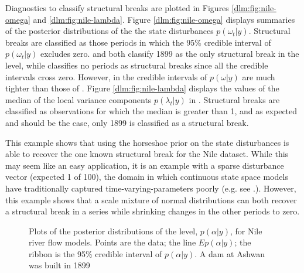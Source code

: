 Diagnostics to classify structural breaks are plotted in Figures \ref{dlm:fig:nile-omega} and \ref{dlm:fig:nile-lambda}.
Figure \ref{dlm:fig:nile-omega} displays summaries of the posterior distributions of the the state disturbances $p(\omega_{t} | y)$.
Structural breaks are classified as those periods in which the 95\% credible interval of $p(\omega_{t} | y)$ excludes zero.
 and  both classify 1899 as the only structural break in the level, while  classifies no periods as structural breaks since all the credible intervals cross zero.
However, in  the credible intervals of $p(\omega|y)$ are much tighter than those of .
Figure \ref{dlm:fig:nile-lambda} displays the values of the median of the local variance components $p(\lambda_{t} | y)$ in .
Structural breaks are classified as observations for which the median is greater than 1, and as expected and should be the case, only 1899 is classified as a structural break.

This example shows that using the horseshoe prior on the state disturbances is able to recover the one known structural break for the Nile dataset.
While this may seem like an easy application, it is an example with a sparse disturbance vector (expected 1 of 100), the domain in which continuous state space models have traditionally captured time-varying-parameters poorly (e.g. see .).
However, this example shows that a scale mixture of normal distributions can both recover a structural break in a series while shrinking changes in the other periods to zero.

\begin{figure}[htpb]
  \centering
  \begin{subfigure}{1.0\textwidth}
    \caption{}
    \label{dlm:fig:nile-posterior-1}    
  \end{subfigure}
  \begin{subfigure}{1.0\textwidth}
    \caption{}
    \label{dlm:fig:nile-posterior-2}
  \end{subfigure}
  \begin{subfigure}{1.0\textwidth}
    \caption{}
    \label{dlm:fig:nile-posterior-3}
  \end{subfigure}
  \caption{Plots of the posterior distributions of the level, $p(\alpha | y)$, for Nile river flow models. Points are the data; the line $E p(\alpha | y)$; the ribbon is the 95\% credible interval of $p(\alpha | y)$. A dam at Ashwan was built in 1899}
  \label{dlm:fig:nile-posterior}
\end{figure}

